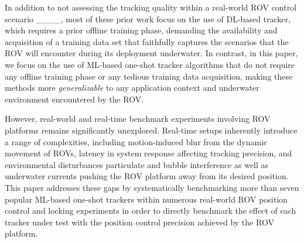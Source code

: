 In addition to not assessing the tracking quality within a real-world ROV control scenario ____, most of these prior work focus on the use of DL-based tracker, which requires a prior offline training phase, demanding the availability and acquisition of a training data set that faithfully captures the scenarios that the ROV will encounter during its deployment underwater. In contrast, in this paper, we focus on the use of ML-based one-shot tracker algorithms that do not require any offline training phase or any tedious training data acquisition, making these methods more \textit{generalizable} to any application context and underwater environment encountered by the ROV. 



 
However, real-world and real-time benchmark experiments involving ROV platforms remains significantly unexplored. Real-time setups inherently introduce a range of complexities, including motion-induced blur from the dynamic movement of ROVs, latency in system response affecting tracking precision, and environmental disturbances particulate and bubble interference as well as underwater currents pushing the ROV platform away from its desired position. %
%
This paper addresses these gaps by systematically benchmarking more than seven popular ML-based one-shot trackers within numerous real-world ROV position control and locking experiments in order to directly benchmark the effect of each tracker under test with the position control precision achieved by the ROV platform.

